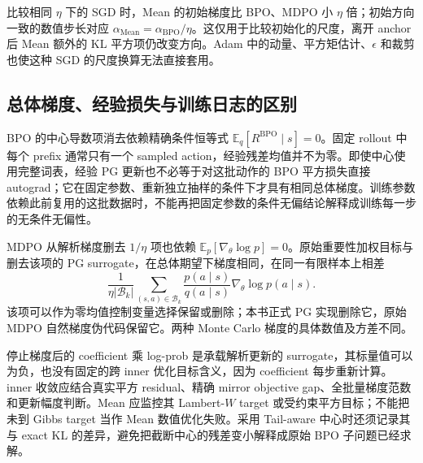 比较相同 $\eta$ 下的 SGD 时，Mean 的初始梯度比 BPO、MDPO 小 $\eta$ 倍；初始方向一致的数值步长对应 $\alpha_{\mathrm{Mean}}=\alpha_{\mathrm{BPO}}/\eta$。这仅用于比较初始化的尺度，离开 anchor 后 Mean 额外的 KL 平方项仍改变方向。Adam 中的动量、平方矩估计、$\epsilon$ 和裁剪也使这种 SGD 的尺度换算无法直接套用。

\subsection{总体梯度、经验损失与训练日志的区别}
\label{subsec:ch2-population-empirical-surrogate}

BPO 的中心导数项消去依赖精确条件恒等式 $\mathbb E_q[R^{\mathrm{BPO}}\mid s]=0$。固定 rollout 中每个 prefix 通常只有一个 sampled action，经验残差均值并不为零。即使中心使用完整词表，经验 PG 更新也不必等于对这批动作的 BPO 平方损失直接 autograd；它在固定参数、重新独立抽样的条件下才具有相同总体梯度。训练参数依赖此前复用的这批数据时，不能再把固定参数的条件无偏结论解释成训练每一步的无条件无偏性。

MDPO 从解析梯度删去 $1/\eta$ 项也依赖 $\mathbb E_{p}[\nabla_\theta\log p]=0$。原始重要性加权目标与删去该项的 PG surrogate，在总体期望下梯度相同，在同一有限样本上相差
\begin{equation*}
 \frac1{\eta|\mathcal B_k|}\sum_{(s,a)\in\mathcal B_k}
 \frac{p(a\mid s)}{q(a\mid s)}\nabla_\theta\log p(a\mid s).
\end{equation*}
该项可以作为零均值控制变量选择保留或删除；本书正式 PG 实现删除它，原始 MDPO 自然梯度伪代码保留它。两种 Monte Carlo 梯度的具体数值及方差不同。

停止梯度后的 coefficient 乘 log-prob 是承载解析更新的 surrogate，其标量值可以为负，也没有固定的跨 inner 优化目标含义，因为 coefficient 每步重新计算。inner 收敛应结合真实平方 residual、精确 mirror objective gap、全批量梯度范数和更新幅度判断。Mean 应监控其 Lambert-$W$ target 或受约束平方目标；不能把未到 Gibbs target 当作 Mean 数值优化失败。采用 Tail-aware 中心时还须记录其与 exact KL 的差异，避免把截断中心的残差变小解释成原始 BPO 子问题已经求解。
